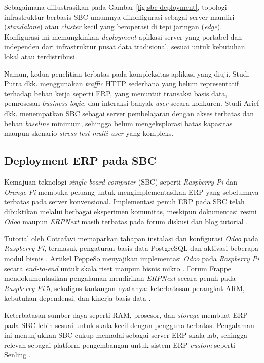 Sebagaimana diilustrasikan pada Gambar \ref{fig:sbc-deployment}, topologi infrastruktur berbasis SBC umumnya dikonfigurasi sebagai server mandiri (\textit{standalone}) atau \textit{cluster} kecil yang beroperasi di tepi jaringan (\textit{edge}). Konfigurasi ini memungkinkan \textit{deployment} aplikasi server yang portabel dan independen dari infrastruktur pusat data tradisional, sesuai untuk kebutuhan lokal atau terdistribusi.

Namun, kedua penelitian terbatas pada kompleksitas aplikasi yang diuji. Studi Putra dkk. menggunakan \textit{traffic} HTTP sederhana yang belum representatif terhadap beban kerja seperti ERP, yang menuntut transaksi basis data, pemrosesan \textit{business logic}, dan interaksi banyak \textit{user} secara konkuren. Studi Arief dkk. menempatkan SBC sebagai server pembelajaran dengan akses terbatas dan beban \textit{baseline} minimum, sehingga belum mengeksplorasi batas kapasitas maupun skenario \textit{stress test} \textit{multi-user} yang kompleks.

\subsection{Deployment ERP pada SBC}

Kemajuan teknologi \textit{single-board computer} (SBC) seperti \textit{Raspberry Pi} dan \textit{Orange Pi} membuka peluang untuk mengimplementasikan ERP yang sebelumnya terbatas pada server konvensional. Implementasi penuh ERP pada SBC telah dibuktikan melalui berbagai eksperimen komunitas, meskipun dokumentasi resmi \textit{Odoo} maupun \textit{ERPNext} masih terbatas pada forum diskusi dan blog tutorial \cite{cottafavi2023odoorpi, peppe8o2023odoorpi, frappe2023erpnextpi}.

Tutorial oleh Cottafavi memaparkan tahapan instalasi dan konfigurasi \textit{Odoo} pada \textit{Raspberry Pi}, termasuk pengaturan basis data PostgreSQL dan aktivasi beberapa modul bisnis \cite{cottafavi2023odoorpi}. Artikel Peppe8o menyajikan implementasi \textit{Odoo} pada \textit{Raspberry Pi} secara \textit{end-to-end} untuk skala riset maupun bisnis mikro \cite{peppe8o2023odoorpi}. Forum Frappe mendokumentasikan pengalaman mendirikan \textit{ERPNext} secara penuh pada \textit{Raspberry Pi} 5, sekaligus tantangan nyatanya: keterbatasan perangkat ARM, kebutuhan dependensi, dan kinerja basis data \cite{frappe2023erpnextpi}.

Keterbatasan sumber daya seperti RAM, prosesor, dan \textit{storage} membuat ERP pada SBC lebih sesuai untuk skala kecil dengan pengguna terbatas. Pengalaman ini menunjukkan SBC cukup memadai sebagai server ERP skala lab, sehingga relevan sebagai platform pengembangan untuk sistem ERP \textit{custom} seperti Senling \cite{cottafavi2023odoorpi, peppe8o2023odoorpi, frappe2023erpnextpi}.



